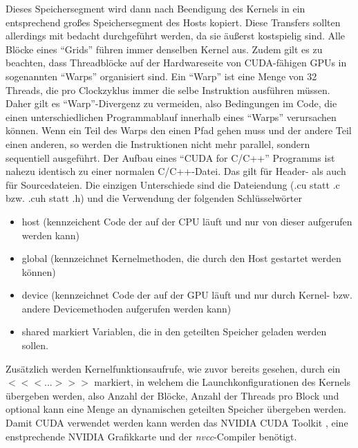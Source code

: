 \documentclass[12pt, onecolumn, notitlepage]{scrartcl}
\begin{document}
Dieses Speichersegment wird dann nach Beendigung des Kernels in ein entsprechend großes Speichersegment des Hosts kopiert. Diese Transfers sollten allerdings mit bedacht durchgeführt werden, da sie äußerst kostspielig sind.\newline
Alle Blöcke eines \enquote{Grids} führen immer denselben Kernel aus. 
Zudem gilt es zu beachten, dass Threadblöcke auf der Hardwareseite von CUDA-fähigen GPUs in sogenannten \enquote{Warps} organisiert sind. Ein \enquote{Warp} ist eine Menge von 32 Threads, die pro Clockzyklus immer die selbe Instruktion ausführen müssen. Daher gilt es \enquote{Warp}-Divergenz zu
vermeiden, also Bedingungen im Code, die einen unterschiedlichen Programmablauf innerhalb eines \enquote{Warps} verursachen können. Wenn ein Teil des Warps den einen Pfad gehen muss und der andere Teil einen anderen, so werden die Instruktionen nicht mehr parallel, sondern sequentiell ausgeführt. \newline
Der Aufbau eines \enquote{CUDA for C/C++} Programms ist nahezu identisch zu einer normalen C/C++-Datei. Das gilt für Header- als auch für Sourcedateien.
Die einzigen Unterschiede sind die Dateiendung (.cu statt .c bzw. .cuh statt .h) und die Verwendung der folgenden Schlüsselwörter
\begin{itemize}
\item \underline{\hspace{0.5cm}}host\underline{\hspace{0.5cm}} (kennzeichent Code der auf der CPU läuft und nur von dieser aufgerufen werden kann)
\item \underline{\hspace{0.5cm}}global\underline{\hspace{0.5cm}} (kennzeichnet Kernelmethoden, die durch den Host gestartet werden können) 
\item \underline{\hspace{0.5cm}}device\underline{\hspace{0.5cm}} (kennzeichnet Code der auf der GPU läuft und nur durch Kernel- bzw. andere Devicemethoden aufgerufen werden kann) 
\item \underline{\hspace{0.5cm}}shared\underline{\hspace{0.5cm}}
markiert Variablen, die in den geteilten Speicher geladen werden sollen. 
\end{itemize}  
Zusätzlich werden Kernelfunktionsaufrufe, wie zuvor bereits gesehen, durch ein \newline
$<<<...>>>$ markiert, in welchem die Launchkonfigurationen des Kernels übergeben werden, also Anzahl der Blöcke, Anzahl der Threads pro Block und optional kann
eine Menge an dynamischen geteilten Speicher übergeben werden. \newline
Damit CUDA verwendet werden kann werden das NVIDIA CUDA Toolkit , eine enstprechende NVIDIA Grafikkarte und 
der \textit{nvcc}-Compiler benötigt.
\end{document}
